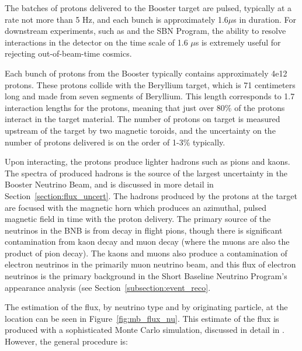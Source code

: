 The batches of protons delivered to the Booster target are pulsed, typically at a rate not more than 5 Hz, and each bunch is approximately 1.6$\mu$s in duration.  For downstream experiments, such as \MB and the SBN Program, the ability to resolve interactions in the detector on the time scale of 1.6 $\mu$s is extremely useful for rejecting out-of-beam-time cosmics.  

Each bunch of protons from the Booster typically contains approximately 4e12 protons.  These protons collide with the Beryllium target, which is 71 centimeters long and made from seven segments of Beryllium.  This length corresponds to 1.7 interaction lengths for the protons, meaning that just over 80\% of the protons interact in the target material.  The number of protons on target is measured upstream of the target by two magnetic toroids, and the uncertainty on the number of protons delivered is on the order of 1-3\% typically.

Upon interacting, the protons produce lighter hadrons such as pions and kaons.  The spectra of produced hadrons is the source of the largest uncertainty in the Booster Neutrino Beam, and is discussed in more detail in Section~\ref{section:flux_uncert}.  The hadrons produced by the protons at the target are focused with the magnetic horn which produces an azimuthal, pulsed magnetic field in time with the proton delivery.  The primary source of the neutrinos in the BNB is from decay in flight pions, though there is significant contamination from kaon decay and muon decay (where the muons are also the product of pion decay).  The kaons and muons also produce a contamination of electron neutrinos in the primarily muon neutrino beam, and this flux of electron neutrinos is the primary background in the Short Baseline Neutrino Program's \nue appearance analysis (see Section~\ref{subsection:event_reco}.

The estimation of the flux, by neutrino type and by originating particle, at the \MB location can be seen in Figure~\ref{fig:mb_flux_nu}.  This estimate of the flux is produced with a sophisticated Monte Carlo simulation, discussed in detail in \cite{AguilarArevalo:2008yp}.  However, the general procedure is:

